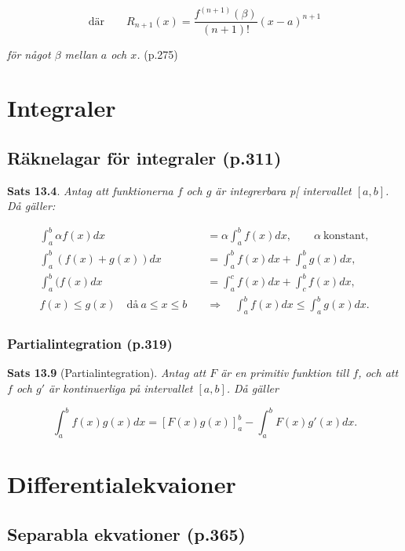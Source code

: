 \documentclass[11pt]{article}
\begin{document}
\begin{equation}
    \text{där}\qquad R_{n + 1}(x) = \frac{f^{(n + 1)}(\beta)}{(n + 1)!}(x - a)^{n + 1}
\end{equation}

\textit{för något $\beta$ mellan $a$ och $x$.} (p.275)

\newpage
\section{Integraler}

\subsection{Räknelagar för integraler (p.311)}

\textbf{Sats 13.4}. \textit{Antag att funktionerna $f$ och $g$ är integrerbara p[ intervallet $[a, b]$. Då gäller:}

\begin{align}
    \int_a^b{\alpha f(x)} dx &= \alpha \int_a^b{f(x)} dx, \qquad \alpha\ \text{konstant},\\
    \int_a^b{(f(x) + g(x))} dx &= \int_a^b{f(x)} dx + \int_a^b{g(x)} dx,\\
    \int_a^b{(f(x)} dx &= \int_a^c{f(x)} dx + \int_c^b{f(x)} dx,\\
    f(x) \leq g(x) \quad \text{då}\ a \leq x \leq b \quad &\Rightarrow \quad \int_a^b{f(x)} dx \leq \int_a^b{g(x)} dx.
\end{align}

\subsubsection{Partialintegration (p.319)}

\textbf{Sats 13.9} (Partialintegration). \textit{Antag att $F$ är en primitiv funktion till $f$, och att $f$ och $g'$ är kontinuerliga på intervallet $[a, b]$. Då gäller}

\begin{equation}
    \int_a^b{f(x)g(x)}dx = \left [F(x)g(x)\right ]_a^b - \int_a^b{F(x)g'(x)}dx.
\end{equation}

\newpage
\section{Differentialekvaioner}

\subsection{Separabla ekvationer (p.365)}
\end{document}
